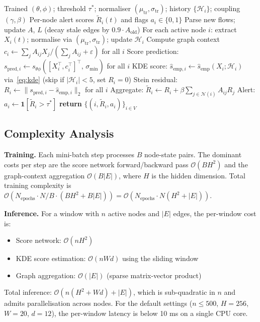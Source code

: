 \begin{algorithm}[t]
\caption{\textsc{Siren} Inference (per time window)}
\label{alg:infer}
\begin{algorithmic}[1]
\Require Trained $(\theta, \phi)$; threshold $\tau^*$;
         normaliser $(\mu_\mathrm{tr}, \sigma_\mathrm{tr})$;
         history $\{\mathcal{H}_i\}$;
         coupling $(\gamma, \beta)$
\Ensure Per-node alert scores $\tilde{R}_i(t)$ and flags $a_i \in \{0,1\}$
\State Parse new flows; update $A$, $L$ (decay stale edges by $0.9 \cdot A_{\mathrm{old}}$)
\State For each active node $i$: extract $X_i(t)$; normalise via
       $(\mu_\mathrm{tr}, \sigma_\mathrm{tr})$; update $\mathcal{H}_i$
\State Compute graph context $c_i \leftarrow \sum_j A_{ij} X_j /
       (\sum_j A_{ij} + \varepsilon)$ for all $i$
\State Score prediction: $s_{\mathrm{pred},i}
       \leftarrow s_{\theta\phi}\!\left([X_i^\top, c_i^\top]^\top,\,
       \sigma_{\min}\right)$ for all $i$
\State KDE score: $\hat{s}_{\mathrm{emp},i}
       \leftarrow \hat{s}_{\mathrm{emp}}(X_i; \mathcal{H}_i)$
       via~\eqref{eq:kde} (skip if $|\mathcal{H}_i| < 5$, set $R_i = 0$)
\State Stein residual: $R_i \leftarrow
       \|s_{\mathrm{pred},i} - \hat{s}_{\mathrm{emp},i}\|_2$ for all $i$
\State Aggregate: $\tilde{R}_i \leftarrow R_i + \beta \sum_{j\in\mathcal{N}(i)} A_{ij} R_j$
\State Alert: $a_i \leftarrow \mathbf{1}[\tilde{R}_i > \tau^*]$
\State \textbf{return} $\{(i, \tilde{R}_i, a_i)\}_{i \in V}$
\end{algorithmic}
\end{algorithm}

\subsection{Complexity Analysis}
\label{sec:complexity}

\textbf{Training.}
Each mini-batch step processes $B$ node-state pairs.
The dominant costs per step are the score network forward/backward pass
$\mathcal{O}(BH^2)$ and the graph-context aggregation $\mathcal{O}(B|E|)$,
where $H$ is the hidden dimension.
Total training complexity is $\mathcal{O}(N_{\mathrm{epochs}} \cdot N/B \cdot
(BH^2 + B|E|)) = \mathcal{O}(N_{\mathrm{epochs}} \cdot N(H^2 + |E|))$.

\textbf{Inference.}
For a window with $n$ active nodes and $|E|$ edges, the per-window cost is:
\begin{itemize}
    \item Score network: $\mathcal{O}(nH^2)$
    \item KDE score estimation: $\mathcal{O}(nWd)$ using the sliding window
    \item Graph aggregation: $\mathcal{O}(|E|)$ (sparse matrix-vector product)
\end{itemize}
Total inference: $\mathcal{O}(n(H^2 + Wd) + |E|)$, which is
sub-quadratic in $n$ and admits parallelisation across nodes.
For the default settings ($n \le 500$, $H = 256$, $W = 20$, $d = 12$),
the per-window latency is below 10 ms on a single CPU core.